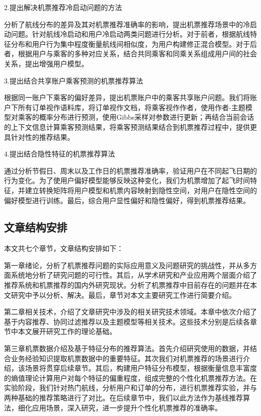 2.提出解决机票推荐冷启动问题的方法

分析了航线分布的差异及其对机票推荐准确率的影响，提出机票推荐场景中的冷启动问题。针对航线冷启动和用户冷启动两类问题进行分析。对于前者，根据航线特征分布和用户行为集中程度衡量航线间相似度，为用户构建修正混合模型。对于后者，根据用户与乘客的多种对应关系，结合共同乘客和同乘关系组成用户间的社会关系，提出增强用户模型。


3.提出结合共享账户乘客预测的机票推荐算法

根据同一账户下乘客的偏好差异，提出机票账户中的乘客共享账户问题。我们将账户下所有订单视作语料库，将订单视作文档，将乘客视作作者，使用作者-主题模型对乘客的概率分布进行预测，使用Gibbs采样对参数进行更新；再结合当前会话的上下文信息计算乘客预测结果，将乘客预测结果结合到机票推荐过程中，提供更具针对性的推荐结果。

4.提出结合隐性特征的机票推荐算法

通过分析节假日、周末以及工作日的机票推荐准确率，验证用户在不同起飞日期的行为变化。为了使用户偏好模型能够反映这种变化，我们为机票增加了起飞时间特征，并建立转换矩阵将用户模型和机票内容映射到隐性空间，对用户在隐性空间的偏好模型进行训练。最后，综合用户显性偏好和隐性偏好，得到机票推荐结果。


\subsection{文章结构安排}
本文共七个章节，文章结构安排如下：

第一章绪论，分析了机票推荐问题的实际应用意义及问题研究的挑战性，并从多方面系统地分析了研究问题的可行性。其后，从学术研究和产业应用两个层面介绍了推荐系统和机票推荐的国内外研究现状。分析了机票推荐中目前存在的问题并在本文研究中予以分析、解决。最后，章节对本文主要研究工作进行简要介绍。

第二章相关技术，介绍了文章研究中涉及的相关研究技术领域。本章中依次介绍了基于内容推荐、协同过滤推荐以及主题模型等相关技术。这些技术分别是后续各章节中本文展开研究工作的理论基础。

第三章机票数据介绍及基于特征分布的推荐算法。首先介绍研究使用的数据，并结合业务经验知识提取机票数据中的重要特征。其次我们对机票推荐的场景进行介绍，该场景将贯穿后续章节。其后，构建用户特征分布模型，根据衡量信息丰富度的熵值理论计算用户对每个特征的偏重程度，组成完整的个性化机票推荐方法。在实验阶段，我们针对热门航线，分析用户和订单的分布，进行机票推荐实验，并与两种基础的推荐策略进行了对比。在后续章节中，我们以此方法作为基线推荐算法，细化应用场景，深入研究，进一步提升个性化机票推荐的准确率。

